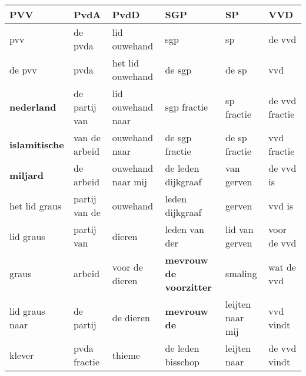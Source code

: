 \begin{tabular}{llllll}
\toprule
            PVV &           PvdA &               PvdD &                    SGP &                SP &             VVD \\
\midrule
            pvv &        de pvda &       lid ouwehand &                    sgp &                sp &          de vvd \\
         de pvv &           pvda &   het lid ouwehand &                 de sgp &             de sp &             vvd \\
      \textbf{nederland} &  de partij van &  lid ouwehand naar &            sgp fractie &        sp fractie &  de vvd fractie \\
   \textbf{islamitische} &  van de arbeid &      ouwehand naar &         de sgp fractie &     de sp fractie &     vvd fractie \\
        \textbf{miljard} &      de arbeid &  ouwehand naar mij &     de leden dijkgraaf &        van gerven &       de vvd is \\
  het lid graus &  partij van de &           ouwehand &        leden dijkgraaf &            gerven &          vvd is \\
      lid graus &     partij van &             dieren &          leden van der &    lid van gerven &     voor de vvd \\
          graus &         arbeid &     voor de dieren &  \textbf{mevrouw de voorzitter} &           smaling &      wat de vvd \\
 lid graus naar &      de partij &          de dieren &             \textbf{mevrouw de} &  leijten naar mij &       vvd vindt \\
         klever &   pvda fractie &             thieme &      de leden bisschop &      leijten naar &    de vvd vindt \\
\bottomrule
\end{tabular}
